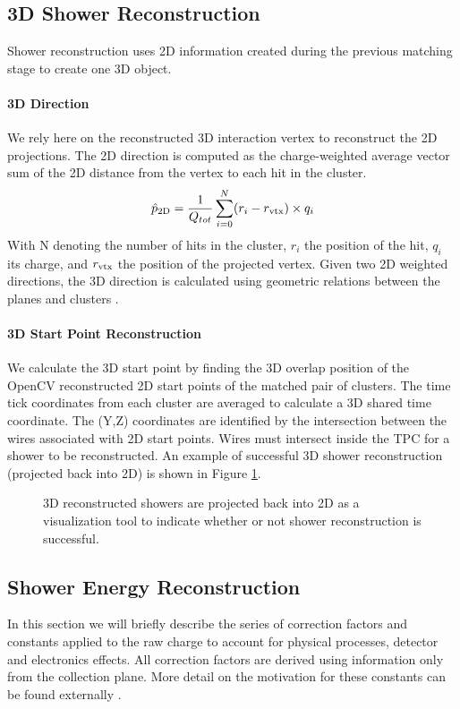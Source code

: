 \subsection{3D Shower Reconstruction}
Shower reconstruction uses 2D information created during the previous matching stage to create one 3D object. 
\paragraph{3D Direction}  We rely here on the reconstructed 3D interaction vertex to reconstruct the 2D projections. The 2D direction is computed as the charge-weighted average vector sum of the 2D distance from the vertex to each hit in the cluster.
\begin{equation}
  \hat{p}_{\rm 2D} = \frac{1}{Q_{tot}} \sum_{i=0}^{N} (r_i - r_{\rm vtx}) \times q_i 
\end{equation}
With N denoting the number of hits in the cluster, $r_i$ the position of the hit, $q_i$ its charge, and $r_{\rm vtx}$ the position of the projected vertex. Given two 2D weighted directions, the 3D direction is calculated using geometric relations between the planes and clusters \cite{bib:larliteGeoHelper}. 

\paragraph{3D Start Point Reconstruction} We calculate the 3D start point by finding the 3D overlap position of the OpenCV reconstructed 2D start points of the matched pair of clusters. The time tick coordinates from each cluster are averaged to calculate a 3D shared time coordinate. The (Y,Z) coordinates are identified by the intersection between the wires associated with 2D start points.  Wires must intersect inside the TPC for a shower to be reconstructed.  An example of successful 3D shower reconstruction (projected back into 2D) is shown in Figure \ref{fig:showers}.

\begin{figure}[h!] %
\centering
{}
\caption{3D reconstructed showers are projected back into 2D as a visualization tool to indicate whether or not shower reconstruction is successful. }
\label{fig:showers}
\end{figure}

\subsection{Shower Energy Reconstruction}
\label{sec:ereco}
\par In this section we will briefly describe the series of correction factors and constants applied to the raw charge to account for physical processes, detector and electronics effects. All correction factors are derived using information only from the collection plane.  More detail on the motivation for these constants can be found externally \cite{bib:davidc_energycalibration}\cite{bib:davidc_recomb}.

